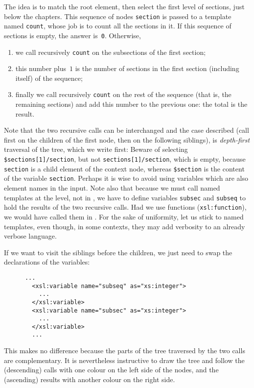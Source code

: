 The idea is to match the root element, then select the first level of
sections, just below the chapters. This sequence of nodes
\texttt{section} is passed to a template named \texttt{count}, whose
job is to count all the sections in it. If this sequence of sections
is empty, the answer is~\texttt{0}. Otherwise,
\begin{enumerate}

\item we call recursively \texttt{count} on the subsections of the
  first section;

\item this number plus~\(1\) is the number of sections in the first
  section (including itself) of the sequence;

\item finally we call recursively \texttt{count} on the rest of the
  sequence (that is, the remaining sections) and add this number to
  the previous one: the total is the result.

\end{enumerate}
Note that the two recursive calls can be interchanged and the case
described (call first on the children of the first node, then on the
following siblings), is \emph{depth\hyp{}first} traversal of the tree,
which we write first:
\noindent Beware of selecting \texttt{\$sections[1]/section}, but not
\texttt{sections[1]/section}, which is empty, because \texttt{section}
is a child element of the context node, whereas \texttt{\$section} is
the content of the variable \texttt{section}. Perhaps it is wise to
avoid using variables which are also element names in the input. Note
also that because we must call named templates at the \XSLT level, not
in \XPath, we have to define variables \texttt{subsec} and
\texttt{subseq} to hold the results of the two recursive calls. Had we
use \XSLT functions (\texttt{xsl:function}), we would have called them
in \XPath. For the sake of uniformity, let us stick to named
templates, even though, in some contexts, they may add verbosity to an
already verbose language.

If we want to visit the siblings before the children, we just need to
swap the declarations of the variables:
\begin{verbatim}
      ...
        <xsl:variable name="subseq" as="xs:integer">
          ...
        </xsl:variable>
        <xsl:variable name="subsec" as="xs:integer">
          ...
        </xsl:variable>
        ...
\end{verbatim}
This makes no difference because the parts of the tree traversed by
the two calls are complementary. It is nevertheless instructive to
draw the \XML tree and follow the (descending) calls with one colour
on the left side of the nodes, and the (ascending) results with
another colour on the right side.

